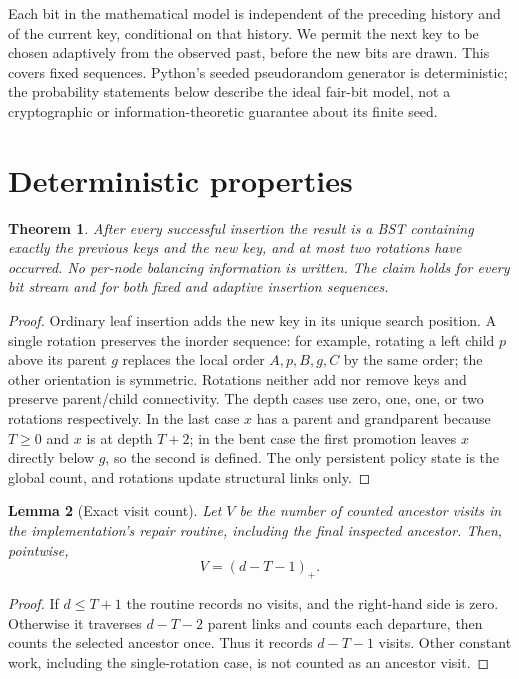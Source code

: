 \documentclass[11pt]{article}
\newtheorem{theorem}{Theorem}
\newtheorem{lemma}[theorem]{Lemma}
\newcommand{\pos}[1]{\left(#1\right)_{+}}
\begin{document}
Each bit in the mathematical model is independent of the preceding history and
of the current key, conditional on that history. We permit the next key to be
chosen adaptively from the observed past, before the new bits are drawn. This
covers fixed sequences. Python's seeded pseudorandom generator is deterministic;
the probability statements below describe the ideal fair-bit model, not a
cryptographic or information-theoretic guarantee about its finite seed.

\section{Deterministic properties}
\begin{theorem}\label{thm:structural}
After every successful insertion the result is a BST containing exactly the
previous keys and the new key, and at most two rotations have occurred. No
per-node balancing information is written. The claim holds for every bit stream
and for both fixed and adaptive insertion sequences.
\end{theorem}
\begin{proof}
Ordinary leaf insertion adds the new key in its unique search position. A single
rotation preserves the inorder sequence: for example, rotating a left child $p$
above its parent $g$ replaces the local order $A,p,B,g,C$ by the same order;
the other orientation is symmetric. Rotations neither add nor remove keys and
preserve parent/child connectivity. The depth cases use zero, one, one, or two
rotations respectively. In the last case $x$ has a parent and grandparent because
$T\geq0$ and $x$ is at depth $T+2$; in the bent case the first promotion leaves
$x$ directly below $g$, so the second is defined. The only persistent policy
state is the global count, and rotations update structural links only.
\end{proof}

\begin{lemma}[Exact visit count]\label{lem:visits}
Let $V$ be the number of \emph{counted ancestor visits} in the implementation's
repair routine, including the final inspected ancestor. Then, pointwise,
\[V=\pos{d-T-1}.\]
\end{lemma}
\begin{proof}
If $d\leq T+1$ the routine records no visits, and the right-hand side is zero.
Otherwise it traverses $d-T-2$ parent links and counts each departure, then
counts the selected ancestor once. Thus it records $d-T-1$ visits. Other constant
work, including the single-rotation case, is not counted as an ancestor visit.
\end{proof}
\end{document}
